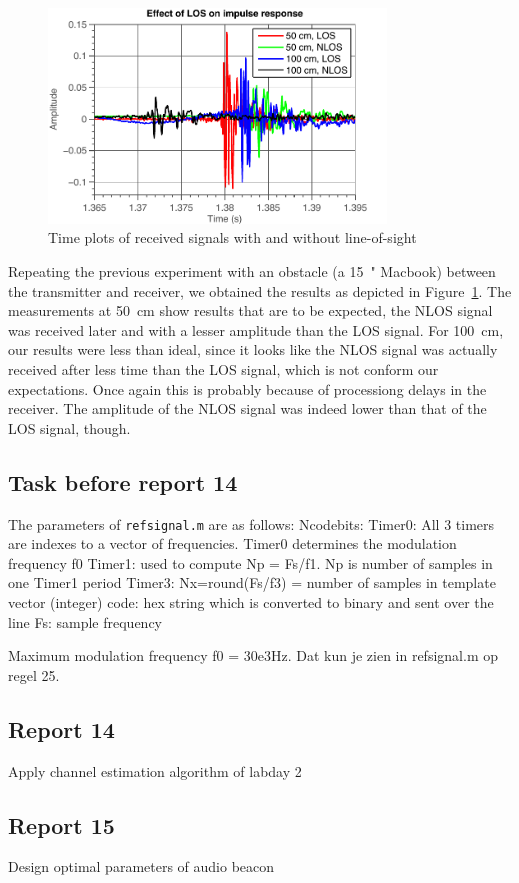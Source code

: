 \documentclass[11pt,titlepage]{report}
\begin{document}
\begin{figure}[H]
	\centering
	\includegraphics[width=0.8\textwidth]{../../deliverable-7-resources/figures/ass-1/report-11-12-13/ass-1-report-13-los-nlos.pdf}
	\caption{Time plots of received signals with and without line-of-sight}
	\label{fig:rep13-nlos}
\end{figure}

Repeating the previous experiment with an obstacle (a \SI{15}{"} Macbook) between the transmitter and receiver, we obtained the results as depicted in Figure~\ref{fig:rep13-nlos}. The measurements at \SI{50}{cm} show results that are to be expected, the NLOS signal was received later and with a lesser amplitude than the LOS signal. For \SI{100}{cm}, our results were less than ideal, since it looks like the NLOS signal was actually received after less time than the LOS signal, which is not conform our expectations. Once again this is probably because of processiong delays in the receiver. The amplitude of the NLOS signal was indeed lower than that of the LOS signal, though.


\subsection{Task before report 14}
The parameters of \texttt{refsignal.m} are as follows:
Ncodebits: 
Timer0: All 3 timers are indexes to a vector of frequencies. Timer0 determines the modulation frequency f0
Timer1: used to compute Np = Fs/f1. Np is number of samples in one Timer1 period
Timer3: Nx=round(Fs/f3) = number of samples in template vector (integer)
code: hex string which is converted to binary and sent over the line
Fs: sample frequency

Maximum modulation frequency f0 = 30e3Hz. Dat kun je zien in refsignal.m op regel 25.



\subsection{Report 14}
Apply channel estimation algorithm of labday 2

\subsection{Report 15}
Design optimal parameters of audio beacon
\end{document}
